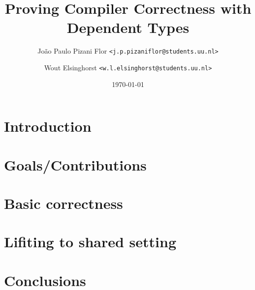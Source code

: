 \documentclass[a4paper]{article}
\title{Proving Compiler Correctness with Dependent Types}
\date{\today}
\author {
    João Paulo Pizani Flor \texttt{<j.p.pizaniflor@students.uu.nl>} \\
    \and Wout Elsinghorst \texttt{<w.l.elsinghorst@students.uu.nl>} \\
}
\begin{document}
    \maketitle

    \section{Introduction}
    \label{sec:intro}

    \section{Goals/Contributions}
    \label{sec:goals}

    \section{Basic correctness}
    \label{sec:basic}

    \section{Lifiting to shared setting}
    \label{sec:lifiting}

    \section{Conclusions}
    \label{sec:conclusions}




\end{document}

